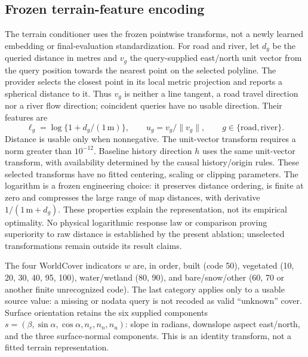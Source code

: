 \documentclass[11pt]{article}
\begin{document}
\subsection{Frozen terrain-feature encoding}
\label{sec:feature-encoding}
The terrain conditioner uses the frozen pointwise transforms,
not a newly learned embedding or final-evaluation standardization. For road
and river, let \(d_g\) be the queried distance in metres and \(v_g\) the
query-supplied east/north unit vector from the query position towards the
nearest point on the selected polyline. The provider selects the closest
point in its local metric projection and reports a spherical distance to it.
Thus \(v_g\) is neither a line tangent, a road travel direction nor a river
flow direction; coincident queries have no usable direction. Their features are
\begin{equation}
 \ell_g=\log\{1+d_g/(1\,\mathrm{m})\},\qquad
 u_g=v_g/\|v_g\|,\qquad g\in\{\mathrm{road},\mathrm{river}\}.
 \label{eq:distance-encoding}
\end{equation}
Distance is usable only when nonnegative. The unit-vector transform requires
a norm greater than \(10^{-12}\). Baseline history direction \(h\) uses the
same unit-vector transform, with availability determined by the causal
history/origin rules. These selected transforms have no fitted centering,
scaling or clipping parameters. The logarithm is a frozen engineering choice:
it preserves distance ordering, is finite at zero and compresses the large
range of map distances, with derivative \(1/(1\,\mathrm m+d_g)\).
These properties explain the representation, not its empirical optimality.
No physical logarithmic response law or comparison proving superiority to raw
distance is established by the present ablation; unselected transformations
remain outside its result claims.

The four WorldCover indicators \(w\) are, in order, built (code 50), vegetated
(10, 20, 30, 40, 95, 100), water/wetland (80, 90), and bare/snow/other (60, 70
or another finite unrecognized code). The last category applies only to a
usable source value: a missing or nodata query is not recoded as valid
``unknown'' cover. Surface orientation retains the six supplied components
\(s=(\beta,\sin\alpha,\cos\alpha,n_e,n_n,n_u)\): slope in radians, downslope
aspect east/north, and the three surface-normal components. This is an
identity transform, not a fitted terrain representation.
\end{document}

